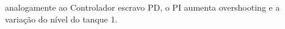 analogamente ao Controlador escravo PD, o PI aumenta overshooting e a variação do nível do tanque 1.